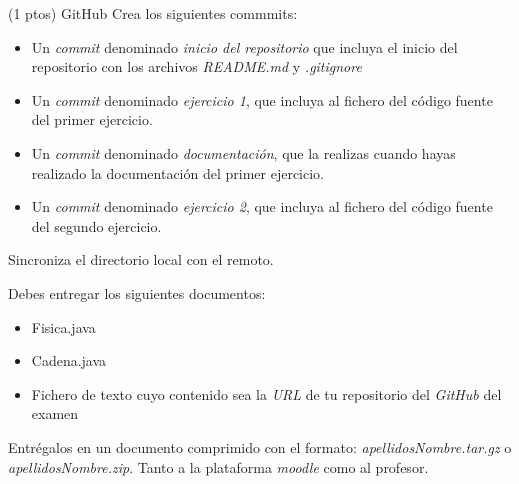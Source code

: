 \documentclass[addpoints,12pt]{exam}
\begin{document}
\begin{questions}
\vspace{0.5 cm}
\question (1 ptos) GitHub
Crea los siguientes commmits:
\begin{itemize}
\item Un \emph{commit} denominado \emph{inicio del repositorio} que incluya el inicio del repositorio con los archivos \emph{README.md} y \emph{.gitignore}
\item Un \emph{commit} denominado \emph{ejercicio 1}, que incluya al fichero del código fuente del primer ejercicio.
\item Un \emph{commit} denominado \emph{documentación}, que la realizas cuando hayas realizado la documentación del primer ejercicio.
\item Un \emph{commit} denominado \emph{ejercicio 2}, que incluya al fichero del código fuente del segundo ejercicio.
\end{itemize}
Sincroniza el directorio local con el remoto.

\end{questions}
\newpage
\vspace{0,5cm}
Debes entregar los siguientes documentos:
\begin{itemize}
\item Fisica.java
\item Cadena.java
\item Fichero de texto cuyo contenido sea la \emph{URL} de tu repositorio del \emph{GitHub} del examen
\end{itemize}

Entrégalos en un documento comprimido con el formato:\emph{ apellidosNombre.tar.gz} o \emph{apellidosNombre.zip}. Tanto a la plataforma \emph{moodle} como al profesor.
\end{document}

